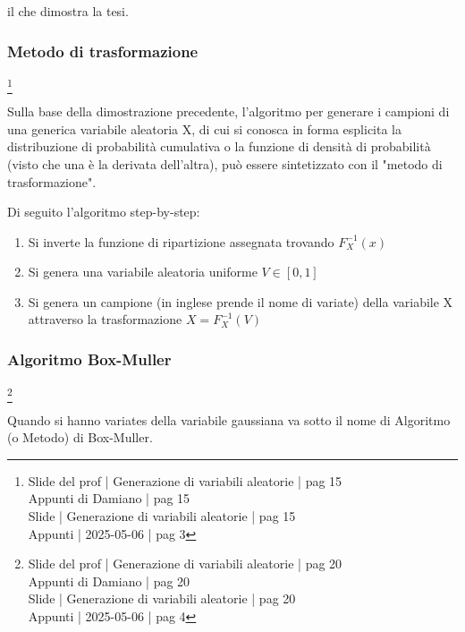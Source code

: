il che dimostra la tesi. \newline 

\newpage 

\subsubsection{Metodo di trasformazione}
\footnote{Slide del prof | Generazione di variabili aleatorie | pag 15 \\
Appunti di Damiano | pag 15 \\ 
Slide | Generazione di variabili aleatorie | pag  15\\ 
Appunti | 2025-05-06 | pag 3
} 

Sulla base della dimostrazione precedente, 
l'algoritmo per generare i campioni di una generica variabile aleatoria X, 
di cui si conosca in forma esplicita la distribuzione di probabilità cumulativa 
o la funzione di densità di probabilità 
(visto che una è la derivata dell'altra), 
può essere sintetizzato con il "metodo di trasformazione". \newline 

Di seguito l'algoritmo step-by-step: 

\begin{enumerate}
    \item Si inverte la funzione di ripartizione assegnata trovando $F_X^{-1} (x)$ 
    \item Si genera una variabile aleatoria uniforme $V \in [0, 1]$ 
    \item Si genera un campione (in inglese prende il nome di variate) della variabile X attraverso la trasformazione $X = F_X^{-1} (V)$
\end{enumerate}

\newpage 

\subsubsection{Algoritmo Box-Muller}
\footnote{Slide del prof | Generazione di variabili aleatorie | pag 20 \\
Appunti di Damiano | pag 20 \\
Slide | Generazione di variabili aleatorie | pag  20\\  
Appunti | 2025-05-06 | pag 4
} 

Quando si hanno variates della variabile gaussiana va sotto il nome di Algoritmo (o Metodo) di Box-Muller. \newline 

